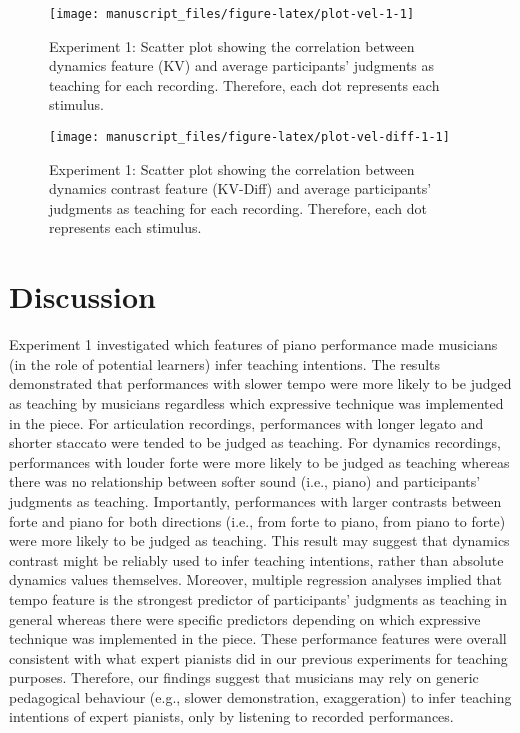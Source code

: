 \documentclass[
  man,floatsintext]{apa6}
\begin{document}
\begin{figure}

{\centering \texttt{[image: manuscript\_files/figure-latex/plot-vel-1-1]} 

}

\caption{\label{fig:vel-1}Experiment 1: Scatter plot showing the correlation between dynamics feature (KV) and average participants' judgments as teaching for each recording. Therefore, each dot represents each stimulus.}\label{fig:plot-vel-1}
\end{figure}

\begin{figure}

{\centering \texttt{[image: manuscript\_files/figure-latex/plot-vel-diff-1-1]} 

}

\caption{\label{fig:vel-diff-1}Experiment 1: Scatter plot showing the correlation between dynamics contrast feature (KV-Diff) and average participants' judgments as teaching for each recording. Therefore, each dot represents each stimulus.}\label{fig:plot-vel-diff-1}
\end{figure}

\clearpage

\hypertarget{discussion}{%
\section{Discussion}\label{discussion}}

Experiment 1 investigated which features of piano performance made musicians (in the role of potential learners) infer teaching intentions. The results demonstrated that performances with slower tempo were more likely to be judged as teaching by musicians regardless which expressive technique was implemented in the piece. For articulation recordings, performances with longer legato and shorter staccato were tended to be judged as teaching. For dynamics recordings, performances with louder forte were more likely to be judged as teaching whereas there was no relationship between softer sound (i.e., piano) and participants' judgments as teaching. Importantly, performances with larger contrasts between forte and piano for both directions (i.e., from forte to piano, from piano to forte) were more likely to be judged as teaching. This result may suggest that dynamics contrast might be reliably used to infer teaching intentions, rather than absolute dynamics values themselves. Moreover, multiple regression analyses implied that tempo feature is the strongest predictor of participants' judgments as teaching in general whereas there were specific predictors depending on which expressive technique was implemented in the piece. These performance features were overall consistent with what expert pianists did in our previous experiments for teaching purposes. Therefore, our findings suggest that musicians may rely on generic pedagogical behaviour (e.g., slower demonstration, exaggeration) to infer teaching intentions of expert pianists, only by listening to recorded performances.
\end{document}
